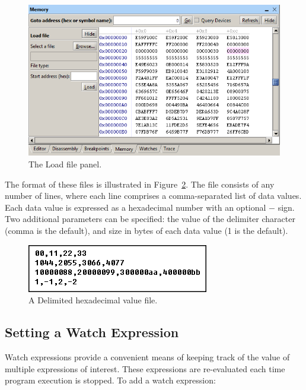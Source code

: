 \documentclass[11pt, twoside, pdftex]{article}
\begin{document}
\begin{figure}[H]
   \begin{center}
      \includegraphics[scale=0.6]{screenshots/figure44.png}
   \end{center}
   \caption{The Load file panel.}
	 \label{fig:44}
\end{figure}

The format of these files is illustrated in Figure~\ref{fig:45}. 
The file consists of any number of lines, where each line
comprises a comma-separated list of data values. Each data value
is expressed as a hexadecimal number with an optional $-$ sign.
Two additional parameters can be specified: the value of the
delimiter character (comma is the default), and size in bytes of
each data value (1 is the default).

\begin{figure}[H]
   \begin{center}
      \includegraphics[scale=0.7]{screenshots/figure45.png}
   \end{center}
   \caption{A Delimited hexadecimal value file.}
	 \label{fig:45}
\end{figure}

\subsection{Setting a Watch Expression}

Watch expressions provide a convenient means of keeping track of
the value of multiple expressions of interest. These expressions
are re-evaluated each time program execution is stopped. 
To add a watch expression:
\end{document}
